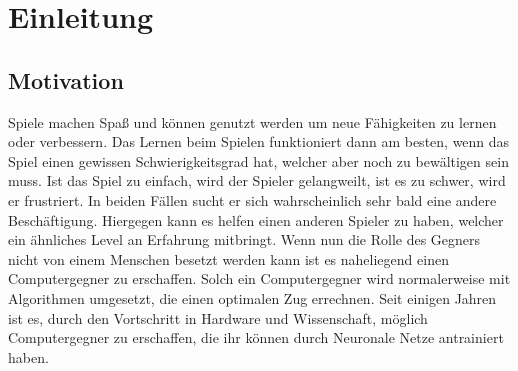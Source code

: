 \chapter{Einleitung}
\label{cha:Einleitung}



\section{Motivation}

Spiele machen Spaß und können genutzt werden um neue Fähigkeiten zu lernen oder verbessern. Das Lernen beim Spielen funktioniert dann am besten, wenn das Spiel einen gewissen Schwierigkeitsgrad hat, welcher aber noch zu bewältigen sein muss. Ist das Spiel zu einfach, wird der Spieler gelangweilt, ist es zu schwer, wird er frustriert. In beiden Fällen sucht er sich wahrscheinlich sehr bald eine andere Beschäftigung. Hiergegen kann es helfen einen anderen Spieler zu haben, welcher ein ähnliches Level an Erfahrung mitbringt. Wenn nun die Rolle des Gegners nicht von einem Menschen besetzt werden kann ist es naheliegend einen Computergegner zu erschaffen. Solch ein Computergegner wird normalerweise mit Algorithmen umgesetzt, die einen optimalen Zug errechnen. Seit einigen Jahren ist es, durch den Vortschritt in Hardware und Wissenschaft, möglich Computergegner zu erschaffen, die ihr können durch Neuronale Netze antrainiert haben. 




